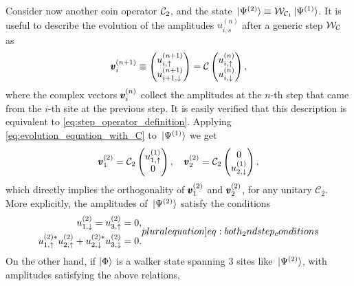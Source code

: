 Consider now another coin operator ${\mathcal{C}}_2$, and the state
$\ket*{\Psi^{(2)}} \equiv {\mathcal{W}}_{{\mathcal{C}}_1} \ket*{\Psi^{(1)}}$.
It is useful to describe the evolution of the amplitudes $u_{i, s}^{(n)}$ after a generic step ${\mathcal{W}}_{\mathcal C}$ as
\begin{equation}
	\pmb{v}_i^{(n+1)} \equiv
	\begin{pmatrix}
		u^{(n+1)}_{i, \uparrow} \\ u^{(n+1)}_{i+1, \downarrow}
	\end{pmatrix}
	= \mathcal C
	\begin{pmatrix}
		u^{(n)}_{i, \uparrow} \\ u^{(n)}_{i, \downarrow}
	\end{pmatrix},
	\label{eq:evolution_equation_with_C}
\end{equation}
where the complex vectors $\pmb{v}_i^{(n)}$ collect the amplitudes at the $n$-th step that came from the $i$-th site at the previous step.
It is easily verified that this description is equivalent to \cref{eq:step_operator_definition}.
Applying \cref{eq:evolution_equation_with_C} to $\ket*{\Psi^{(1)}}$ we get
\begin{equation}
	\pmb{v}^{(2)}_1
	=
	\mathcal C_2
	\begin{pmatrix}
		u^{(1)}_{1,\uparrow} \\ 0
	\end{pmatrix},
	\quad
	\pmb{v}^{(2)}_2
	=
	\mathcal C_2
	\begin{pmatrix}
		0 \\ u^{(1)}_{2,\downarrow} 
	\end{pmatrix},
	\label{eq:leading_to_first_orthogonality}
\end{equation}
which directly implies the orthogonality of
$\pmb{v}_1^{(2)}$ and $\pmb{v}_{2}^{(2)}$,
for any unitary $\mathcal C_2$.
More explicitly, the amplitudes of $\ket*{\Psi^{(2)}}$ satisfy the conditions
\begin{subequations}
	\begin{align}
		u^{(2)}_{1, \downarrow} = u^{(2)}_{3, \uparrow} = 0,
		\label{eq:vanishing_endpoints_after_2steps}\\
		u^{(2)*}_{1, \uparrow} u^{(2)}_{2, \uparrow}
		+ u^{(2)*}_{2, \downarrow} u^{(2)}_{3, \downarrow} = 0.
		\label{eq:1st_orthogonality_condition}
	\end{align}
	\label[pluralequation]{eq:both_2ndstep_conditions}
\end{subequations}
On the other hand, if $\ket\Phi$ is a walker state spanning $3$ sites like $\ket*{\Psi^{(2)}}$, with amplitudes satisfying the above relations,
